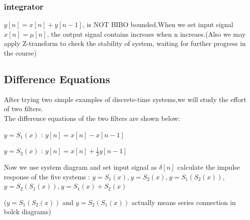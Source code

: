 \documentclass[journal]{IEEEtran}
\begin{document}
\subsubsection{integrator} $y[n]=x[n]+y[n-1]$, is NOT BIBO bounded.When we set input signal $x[n]=\mu[n]$, the output signal contains increaes when n increaes.(Also we may apply Z-transform to check the stability of system, waiting for further progress in the course)
\subsection{Difference Equations}
After trying two simple examples of discrete-time systems,we will study the effort of two filters. 
\\The difference equations of the two filters are shown below:

\vspace{\baselineskip}
$y=S_{1}(x)$  :      $y[n]=x[n]-x[n-1]$ 

\vspace{\baselineskip}
$y=S_{2}(x)$ : $y[n]=x[n]+\frac{1}{2}y[n-1]$

\vspace{\baselineskip}

Now we use system diagram and set input signal as $\delta[n]$ calculate the impulse response of the five systems :
$y=S_{1}(x)$,$~$$y=S_{2}(x)$,$~$$y=S_{1}(S_{2}(x))$,$~$$y=S_{2}(S_{1}(x))$,$~$$y=S_{1}(x)+S_{2}(x)$

($y=S_{1}(S_{2}(x))$ and $y=S_{2}(S_{1}(x))$ actually means series connection in bolck diagrams)
\end{document}
